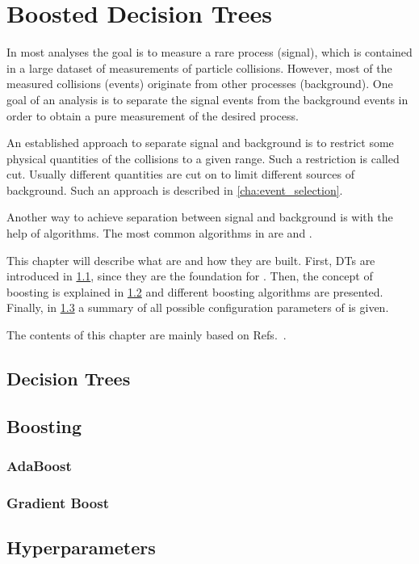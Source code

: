 \chapter{Boosted Decision Trees}\label{cha:boosted_decision_trees}

In most \hep{} analyses the goal is to measure a rare process (signal), which is contained in a
large dataset of measurements of particle collisions.
However, most of the measured collisions (events) originate from other processes (background).
One goal of an analysis is to separate the signal events from the background events in order to obtain a pure
measurement of the desired process.

An established approach to separate signal and background is to restrict some physical quantities of the collisions
to a given range.
Such a restriction is called cut.
Usually different quantities are cut on to limit different sources of background.
Such an approach is described in \cref{cha:event_selection}.

Another way to achieve separation between signal and background is with the help of \ml{} algorithms.
The most common \ml{} algorithms in \hep{} are \bdts{} and \nns{}.

This chapter will describe what \bdts{} are and how they are built.
First, \glspl{DT} are introduced in \cref{sec:decision_trees}, since they are the foundation for \bdts.
Then, the concept of boosting is explained in \cref{sec:boosting} and different boosting algorithms are presented.
Finally, in \cref{sec:hyperparameters} a summary of all possible configuration parameters of \bdts{} is given.

The contents of this chapter are mainly based on Refs.~\cite{ML_HASTIE,ML_TMVA}.

\section{Decision Trees}\label{sec:decision_trees}

\section{Boosting}\label{sec:boosting}

\subsection{AdaBoost}\label{sub:adaboost}

\subsection{Gradient Boost}\label{sub:gradient_boost}

\section{Hyperparameters}\label{sec:hyperparameters}
